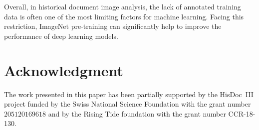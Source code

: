 \documentclass[journal]{IEEEtran}
\newcommand{\af}[1]{{\color{black}#1}}
\newcommand{\lsn}[1]{{\color{orange}#1}}
\begin{document}
\af{Overall,} in historical document image analysis, the lack of annotated training data is often one of the most limiting factors for machine learning.
Facing this restriction, ImageNet pre-training can significantly help to improve the performance of deep learning models.

\lsn{} 
\section*{Acknowledgment}
The work presented in this paper has been partially supported by the HisDoc~III project funded by the Swiss National Science Foundation with the grant number $205120$\textunderscore$169618$ and by the Rising Tide foundation with the grant number CCR-18-130.



\end{document}
